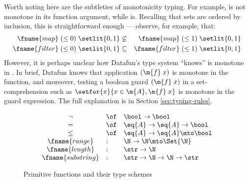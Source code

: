 Worth noting here are the subtleties of monotonicity typing. For example,
 is not monotone in its function argument, while  is.
Recalling that sets are ordered by inclusion, this is straightforward enough ---
observe, for example, that:
\begin{eqnarray*}
 \fname{map}\;(\le 0)\;\setlit{0,1}
 &\not\subseteq& \fname{map}\;(\le 1)\;\setlit{0,1}\\
 \fname{filter}\;(\le 0)\;\setlit{0,1}
 &\subseteq& \fname{filter}\;(\le 1)\;\setlit{0,1}
\end{eqnarray*}
%
However, it is perhaps unclear how Datafun's type system ``knows''
 is monotone in . In brief, Datafun knows that application
$(\m{f}\;x)$ is monotone in the function, and moreover, testing a boolean guard
$(\m{f}\;x)$ in a set-comprehension such as $\setfor{x}{x \in \m{A}, \m{f}\;x}$
is monotone in the guard expression. The full explanation is in Section
\ref{sec:typing-rules}.



\begin{figure}
  \[\begin{array}{cll}
  \neg &\of& \bool \uto \bool\\
  =   &\of& \eq{A} \uto \eq{A} \uto \bool\\
  \le &\of& \eq{A} \uto \eq{A} \mto \bool\\
  \fname{range}    &:& \N \uto \N \mto \Set{\N}\\
  \fname{length}   &:& \str \uto \N\\
  \fname{substring} &:& \str \uto \N \uto \N \uto \str
  \end{array}\]
  \caption{Primitive functions and their type schemes}
  \label{fig:primitives}
\end{figure}

